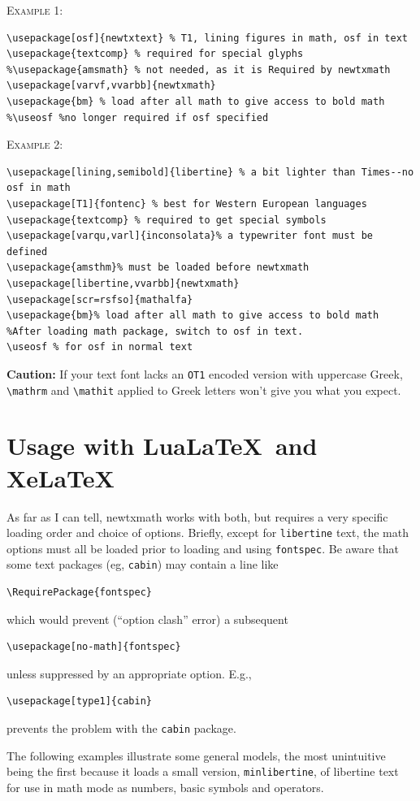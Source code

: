 \documentclass[11pt]{article}
\theoremstyle{oldplain}
\theoremstyle{plain}
\begin{document}
\textsc{Example 1:}
\begin{verbatim}
\usepackage[osf]{newtxtext} % T1, lining figures in math, osf in text
\usepackage{textcomp} % required for special glyphs
%\usepackage{amsmath} % not needed, as it is Required by newtxmath
\usepackage[varvf,vvarbb]{newtxmath}
\usepackage{bm} % load after all math to give access to bold math
%\useosf %no longer required if osf specified
\end{verbatim}
\textsc{Example 2:}
\begin{verbatim}
\usepackage[lining,semibold]{libertine} % a bit lighter than Times--no osf in math
\usepackage[T1]{fontenc} % best for Western European languages
\usepackage{textcomp} % required to get special symbols
\usepackage[varqu,varl]{inconsolata}% a typewriter font must be defined
\usepackage{amsthm}% must be loaded before newtxmath
\usepackage[libertine,vvarbb]{newtxmath}
\usepackage[scr=rsfso]{mathalfa}
\usepackage{bm}% load after all math to give access to bold math
%After loading math package, switch to osf in text.
\useosf % for osf in normal text
\end{verbatim}

\textbf{Caution:} If your text font lacks an {\tt OT1} encoded version with uppercase Greek, \verb|\mathrm| and \verb|\mathit| applied to Greek letters won't give you what you expect.
\section{Usage with Lua\LaTeX\ and Xe\LaTeX}
As far as I can tell, \textsf{newtxmath} works with both, but requires a very specific loading order and choice of options. Briefly, except for {\tt libertine} text, the math options must all be loaded prior to loading and using {\tt fontspec}. Be aware that some text packages (eg, {\tt cabin}) may contain a line like
\begin{verbatim}
\RequirePackage{fontspec}
\end{verbatim}
which would prevent (``option clash'' error) a subsequent 
\begin{verbatim}
\usepackage[no-math]{fontspec}
\end{verbatim}
unless suppressed by an appropriate option. E.g., 
\begin{verbatim}
\usepackage[type1]{cabin}
\end{verbatim}
prevents the problem with the {\tt cabin} package.

The following examples illustrate some general models, the most unintuitive being the first because it loads a small version, {\tt minlibertine}, of libertine text for use in math mode as numbers, basic symbols and operators.
\end{document}
